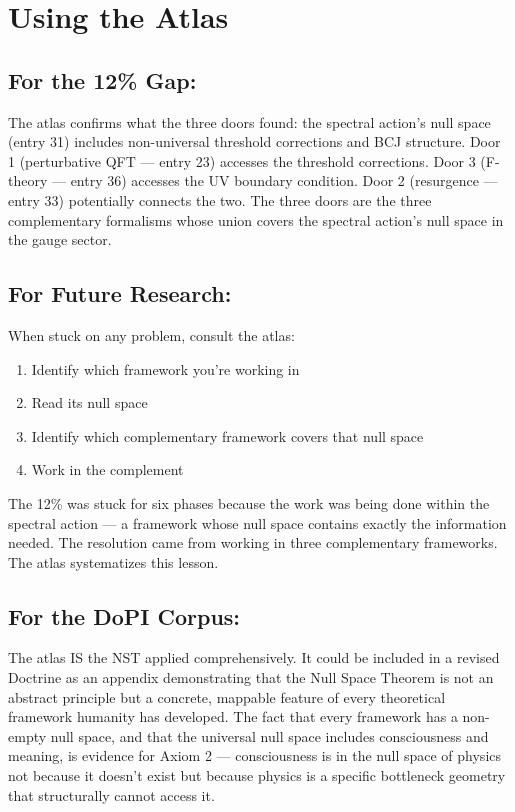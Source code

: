 \bigskip\noindent\makebox[\textwidth]{\color{rulegray}\rule{5cm}{0.3pt}}\bigskip


\section*{Using the Atlas}


\subsection*{For the 12\% Gap:}

The atlas confirms what the three doors found: the spectral action's null space (entry 31) includes non-universal threshold corrections and BCJ structure. Door 1 (perturbative QFT — entry 23) accesses the threshold corrections. Door 3 (F-theory — entry 36) accesses the UV boundary condition. Door 2 (resurgence — entry 33) potentially connects the two. The three doors are the three complementary formalisms whose union covers the spectral action's null space in the gauge sector.


\subsection*{For Future Research:}

When stuck on any problem, consult the atlas:

\begin{enumerate}[nosep,leftmargin=*]
  \item Identify which framework you're working in
  \item Read its null space
  \item Identify which complementary framework covers that null space
  \item Work in the complement
\end{enumerate}


The 12\% was stuck for six phases because the work was being done within the spectral action — a framework whose null space contains exactly the information needed. The resolution came from working in three complementary frameworks. The atlas systematizes this lesson.


\subsection*{For the DoPI Corpus:}

The atlas IS the NST applied comprehensively. It could be included in a revised Doctrine as an appendix demonstrating that the Null Space Theorem is not an abstract principle but a concrete, mappable feature of every theoretical framework humanity has developed. The fact that every framework has a non-empty null space, and that the universal null space includes consciousness and meaning, is evidence for Axiom 2 — consciousness is in the null space of physics not because it doesn't exist but because physics is a specific bottleneck geometry that structurally cannot access it.


